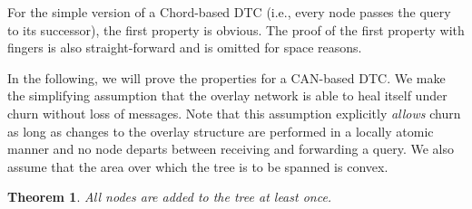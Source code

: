 \documentclass[fleqn,12pt,twoside]{article}
\newtheorem{theorem}{Theorem}
\begin{document}
For the simple version of a Chord-based DTC (i.e., every node passes
the query to its successor), the first property is obvious. The proof
of the first property with fingers is also straight-forward and is
omitted for space reasons.


In the following, we will prove the properties for a CAN-based DTC. We
make the simplifying assumption that the overlay network is able to
heal itself under churn without loss of messages.  Note that this
assumption explicitly \emph{allows} churn as long as changes to the
overlay structure are performed in a locally atomic manner and no node
departs between receiving and forwarding a query. We also assume that
the area over which the tree is to be spanned is convex.

\begin{theorem}
  \label{thm:at-least-once}
  All nodes are added to the tree at least once.
\end{theorem}
\end{document}
